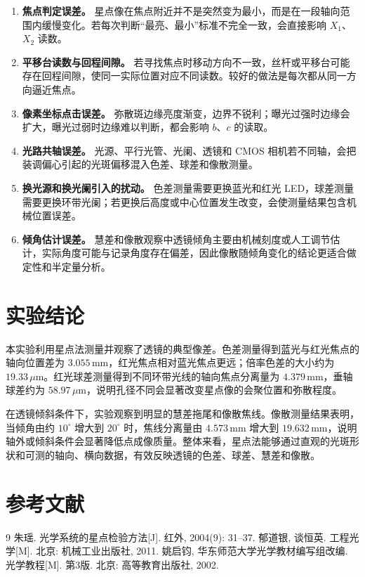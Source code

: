 \documentclass[12pt,a4paper]{article}
\begin{document}
\begin{enumerate}
  \item \textbf{焦点判定误差。} 星点像在焦点附近并不是突然变为最小，而是在一段轴向范围内缓慢变化。若每次判断“最亮、最小”标准不完全一致，会直接影响 $X_1$、$X_2$ 读数。
  \item \textbf{平移台读数与回程间隙。} 若寻找焦点时移动方向不一致，丝杆或平移台可能存在回程间隙，使同一实际位置对应不同读数。较好的做法是每次都从同一方向逼近焦点。
  \item \textbf{像素坐标点击误差。} 弥散斑边缘亮度渐变，边界不锐利；曝光过强时边缘会扩大，曝光过弱时边缘难以判断，都会影响 $b$、$c$ 的读取。
  \item \textbf{光路共轴误差。} 光源、平行光管、光阑、透镜和 CMOS 相机若不同轴，会把装调偏心引起的光斑偏移混入色差、球差和像散测量。
  \item \textbf{换光源和换光阑引入的扰动。} 色差测量需要更换蓝光和红光 LED，球差测量需要更换环带光阑；若更换后高度或中心位置发生改变，会使测量结果包含机械位置误差。
  \item \textbf{倾角估计误差。} 慧差和像散观察中透镜倾角主要由机械刻度或人工调节估计，实际角度可能与记录角度存在偏差，因此像散随倾角变化的结论更适合做定性和半定量分析。
\end{enumerate}

\section{实验结论}

本实验利用星点法测量并观察了透镜的典型像差。色差测量得到蓝光与红光焦点的轴向位置差为 $3.055\,\mathrm{mm}$，红光焦点相对蓝光焦点更远；倍率色差的大小约为 $19.33\,\mu\mathrm{m}$。红光球差测量得到不同环带光线的轴向焦点分离量为 $4.379\,\mathrm{mm}$，垂轴球差约为 $58.97\,\mu\mathrm{m}$，说明孔径不同会显著改变星点像的会聚位置和弥散程度。

在透镜倾斜条件下，实验观察到明显的慧差拖尾和像散焦线。像散测量结果表明，当倾角由约 $10^\circ$ 增大到 $20^\circ$ 时，焦线分离量由 $4.573\,\mathrm{mm}$ 增大到 $19.632\,\mathrm{mm}$，说明轴外或倾斜条件会显著降低点成像质量。整体来看，星点法能够通过直观的光斑形状和可测的轴向、横向数据，有效反映透镜的色差、球差、慧差和像散。

\section*{参考文献}

\begin{thebibliography}{9}
   朱瑶. 光学系统的星点检验方法[J]. 红外, 2004(9): 31--37.
   郁道银, 谈恒英. 工程光学[M]. 北京: 机械工业出版社, 2011.
   姚启钧, 华东师范大学光学教材编写组改编. 光学教程[M]. 第3版. 北京: 高等教育出版社, 2002.
\end{thebibliography}
\end{document}
